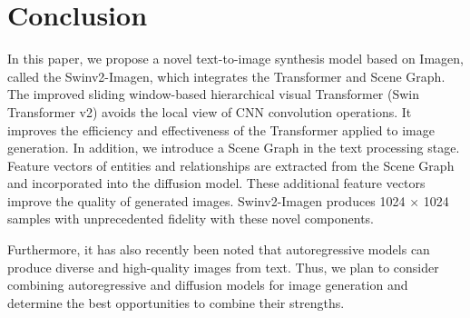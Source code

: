 \documentclass{article}
\begin{document}
\section{Conclusion}
In this paper, we propose a novel text-to-image synthesis model based on Imagen, called the Swinv2-Imagen, which integrates the Transformer and Scene Graph. The improved sliding window-based hierarchical visual Transformer (Swin Transformer v2) avoids the local view of CNN convolution operations. It improves the efficiency and effectiveness of the Transformer applied to image generation. In addition, we introduce a Scene Graph in the text processing stage. Feature vectors of entities and relationships are extracted from the Scene Graph and incorporated into the diffusion model. These additional feature vectors improve the quality of generated images. Swinv2-Imagen produces 1024 × 1024 samples with unprecedented fidelity with these novel components.

Furthermore, it has also recently been noted that autoregressive models can produce diverse and high-quality images from text. Thus, we plan to consider combining autoregressive and diffusion models for image generation and determine the best opportunities to combine their strengths.


  
  
\end{document}
